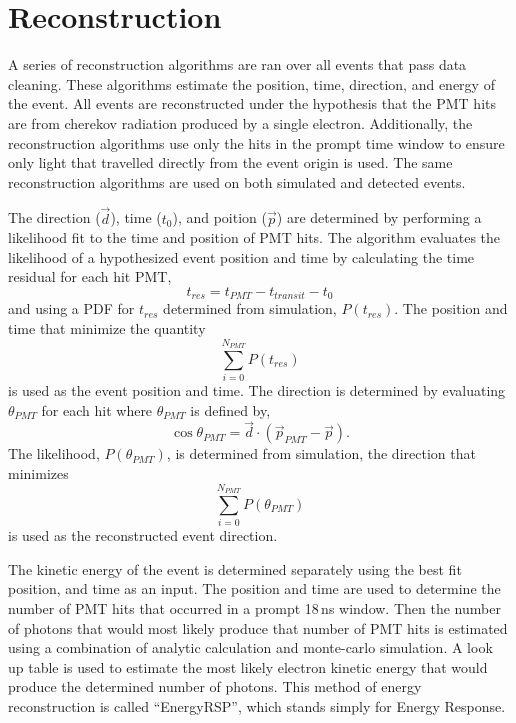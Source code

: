 \section{Reconstruction}
\label{sec:reconstruction}
A series of reconstruction algorithms are ran over all events that pass data cleaning.
These algorithms estimate the position, time, direction, and energy of the event.
All events are reconstructed under the hypothesis that the PMT hits are from cherekov radiation
produced by a single electron.
Additionally, the reconstruction algorithms use only the hits in the prompt time window to ensure only light
that travelled directly from the event origin is used.
The same reconstruction algorithms are used on both simulated and detected events.

The direction ($\vec{d}$), time ($t_{0}$), and poition ($\vec{p}$) are determined by performing a likelihood
fit to the time and position of PMT hits.
The algorithm evaluates the likelihood of a hypothesized event position and time by
calculating the time residual for each hit PMT,
\begin{equation}
    \label{eqn:tres}
t_{res} = t_{PMT} - t_{transit} - t_{0}
\end{equation}
and using a PDF for $t_{res}$ determined from simulation, $P(t_{res})$.
The position and time that minimize the quantity
\begin{equation}
\sum_{i=0}^{N_{PMT}} P(t_{res}) %
\end{equation}
is used as the event position and time.
The direction is determined by evaluating $\theta_{PMT}$ for each hit where
$\theta_{PMT}$ is defined by,
\begin{equation}
    \cos\theta_{PMT} = \vec{d}\cdot\left(\vec{p}_{PMT} - \vec{p}\right)\text{.}
\end{equation}
The likelihood, $P(\theta_{PMT})$, is determined from simulation, the direction
that minimizes
\begin{equation}
\sum_{i=0}^{N_{PMT}} P(\theta_{PMT})
\end{equation}
is used as the reconstructed event direction.

The kinetic energy of the event is determined separately
using the best fit position, and time as an input.
The position and time are used to determine the number of PMT
hits that occurred in a prompt 18\,ns window.
Then the number of photons that would most likely produce
that number of PMT hits is estimated using a combination of
analytic calculation and monte-carlo simulation.
A look up table is used to estimate the most likely electron
kinetic energy that would produce the determined number of photons.
This method of energy reconstruction is called ``EnergyRSP'', which stands
simply for Energy Response.

